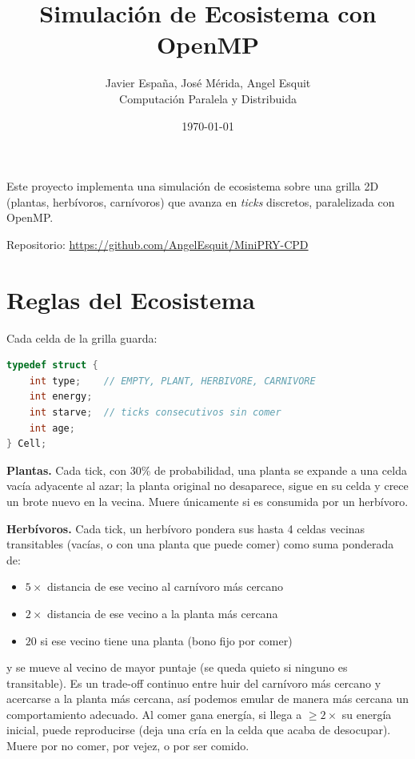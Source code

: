 \documentclass[11pt]{article}
\title{Simulación de Ecosistema con OpenMP}
\author{Javier España, José Mérida, Angel Esquit \\ Computación Paralela y Distribuida}
\date{\today}
\begin{document}
\maketitle

Este proyecto implementa una simulación de ecosistema sobre una grilla 2D
(plantas, herbívoros, carnívoros) que avanza en \emph{ticks} discretos,
paralelizada con OpenMP. 

Repositorio: \url{https://github.com/AngelEsquit/MiniPRY-CPD}

\section{Reglas del Ecosistema}

Cada celda de la grilla guarda:

\begin{lstlisting}[language=c]
typedef struct {
    int type;    // EMPTY, PLANT, HERBIVORE, CARNIVORE
    int energy;
    int starve;  // ticks consecutivos sin comer
    int age;
} Cell;
\end{lstlisting}

\textbf{Plantas.} Cada tick, con 30\% de probabilidad, una planta se
expande a una celda vacía adyacente al azar; la planta original no
desaparece, sigue en su celda y crece un brote nuevo en la vecina. Muere
únicamente si es consumida por un herbívoro.

\textbf{Herbívoros.} Cada tick, un herbívoro pondera sus hasta 4 celdas
vecinas transitables (vacías, o con una planta que puede comer) como
suma ponderada de:

\begin{itemize}
    \item[+] $5 \times$ distancia de ese vecino al carnívoro más cercano
    \item[--] $2 \times$ distancia de ese vecino a la planta más cercana
    \item[+] $20$ si ese vecino tiene una planta (bono fijo por comer)
\end{itemize}

y se mueve al vecino de mayor puntaje (se queda quieto si ninguno es
transitable). Es un trade-off continuo entre huir del carnívoro más
cercano y acercarse a la planta más cercana, así podemos emular de manera
más cercana un comportamiento adecuado. Al comer gana energía, si llega a
$\geq 2\times$ su energía inicial, puede reproducirse (deja una cría en la celda
que acaba de desocupar). Muere por no comer, por vejez, o por ser comido.
\end{document}
